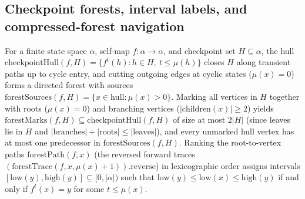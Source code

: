 \begin{result}
\subsection{Checkpoint forests, interval labels, and compressed-forest navigation}
For a finite state space $\alpha$, self-map $f:\alpha\to\alpha$, and checkpoint set $H\subseteq\alpha$,
the hull $\mathrm{checkpointHull}(f,H)=\{f^t(h):h\in H,\ t\le\mu(h)\}$ closes $H$ along transient
paths up to cycle entry, and cutting outgoing edges at cyclic states ($\mu(x)=0$) forms a directed
forest with sources $\mathrm{forestSources}(f,H)=\{x\in\mathrm{hull}:\mu(x)>0\}$. Marking all
vertices in $H$ together with roots ($\mu(x)=0$) and branching vertices ($|\mathrm{children}(x)|\ge 2$)
yields $\mathrm{forestMarks}(f,H)\subseteq\mathrm{checkpointHull}(f,H)$ of size at most $2|H|$ (since
leaves lie in $H$ and $|\mathrm{branches}|+|\mathrm{roots}|\le|\mathrm{leaves}|$), and every unmarked
hull vertex has at most one predecessor in $\mathrm{forestSources}(f,H)$. Ranking the root-to-vertex
paths $\mathrm{forestPath}(f,x)$ (the reversed forward traces
$(\mathrm{forestTrace}(f,x,\mu(x)+1)).\mathrm{reverse}$) in lexicographic order assigns intervals
$[\mathrm{low}(y),\mathrm{high}(y)]\subseteq[0,|\alpha|)$ such that
$\mathrm{low}(y)\le\mathrm{low}(x)\le\mathrm{high}(y)$ if and only if $f^t(x)=y$ for some $t\le\mu(x)$.


\end{result}
